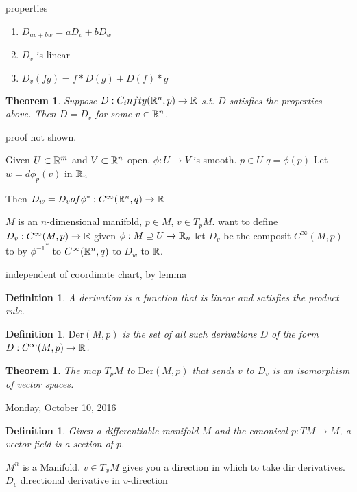 \documentclass[11pt,leqno,oneside]{amsart}
\newcommand{\Der}{\text{Der}}
\theoremstyle{mystyle} \newtheorem{thrm}[thm]{Theorem}
\theoremstyle{mystyle} \newtheorem{defi}[thm]{Definition}
\begin{document}
properties
\begin{prop}
	\begin{enumerate}
		\item $D_{av + bw} = aD_{v} + bD_{w}$
		\item $D_v$ is linear
		\item $D_v(fg) = f*D(g) + D(f)*g$
	\end{enumerate}
\end{prop}
\begin{thrm}
	Suppose $D : C_infty({\mathbb R}^n,p) \to {\mathbb R}$
	s.t. $D$ satisfies the properties above.  Then $D = D_v$ for some $v \in {\mathbb R}^n$.
\end{thrm}
proof not shown.
\begin{lem}
	Given $U \subset {\mathbb R}^m$ and $V \subset {\mathbb R}^n$ open.
	$\phi : U \to V$ is smooth.
	$p \in U$
	$q = \phi(p)$
	Let
	$w = d \phi_p(v)$ in ${\mathbb R}_n$

	Then
	$D_w = D_v of \phi^* : C^\infty({\mathbb R}^n,q) \to {\mathbb R}$

	$M$ is an $n$-dimensional manifold, $p \in M$, $v \in T_pM$.
	want to define
	$D_v : C^\infty(M,p) \to {\mathbb R}$
	given $\phi: M \supseteq U \to {\mathbb R}_n$ let $D_v$ be the composit
	$C^\infty(M, p)$ to by ${\phi^{-1}}^*$ to $C^\infty({\mathbb R}^n,q)$ to $D_w$ to ${\mathbb R}$.

	independent of coordinate chart, by lemma
\end{lem}
\begin{defi}
	A \emph{derivation} is a function that is linear and satisfies the product rule.
\end{defi}
\begin{defi}
	$\Der(M,p)$ is the set of all such derivations $D$ of the form $D: C^\infty(M,p) \to {\mathbb R}$.
\end{defi}
\begin{thrm}
	The map $T_pM$ to $\Der(M,p)$
	that sends $v$ to $D_v$
	is an isomorphism of vector spaces.
\end{thrm}

Monday, October 10, 2016

\begin{defi}
	Given a differentiable manifold $M$ and the canonical $p: TM \to M$, a \emph{vector field} is a section of $p$.
\end{defi}


$M^n$ is a Manifold.
$v \in T_xM$ gives you a direction in which to take dir derivatives.
$D_v$ directional derivative in $v$-direction
\end{document}
